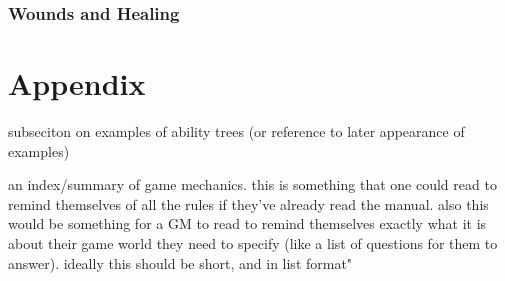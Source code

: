 \documentclass[12pt]{article}
\newcommand{\notes}[1]{{\color{Tan} #1}}
\begin{document}
\subsubsection{Wounds and Healing}\label{sec:wounds}

\section{Appendix}


\notes{subseciton on examples of ability trees (or reference to later appearance of examples)}

\notes{an index/summary of game mechanics. this is something that one could read to remind themselves of all the rules
if they've already read the manual. also this would be something for a GM to read to remind themselves
exactly what it is about their game world they need to specify (like a list of questions for them to answer).
ideally this should be short, and in list format"}
\end{document}
